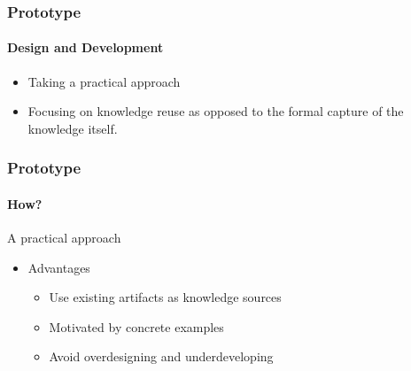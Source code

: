 \documentclass{beamer}
\begin{document}

\begin{frame}

\frametitle{Prototype}
\framesubtitle{Design and Development}

\begin{itemize}
\item Taking a practical approach
\item Focusing on knowledge reuse as opposed to the formal capture of the
				knowledge itself.
\end{itemize}

\end{frame}



\begin{frame}

\frametitle{Prototype}
\framesubtitle{How?}

A practical approach

\begin{itemize}
\item Advantages
\begin{itemize}
\item Use existing artifacts as knowledge sources
\item Motivated by concrete examples %
\item Avoid overdesigning and underdeveloping
\end{itemize}
\end{itemize}
\end{frame}
\end{document}
